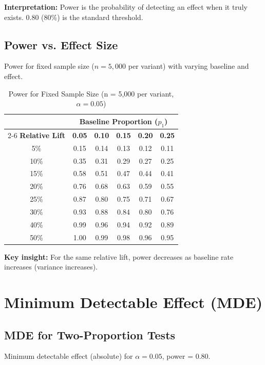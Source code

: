 \textbf{Interpretation:} Power is the probability of detecting an effect when it truly exists. 0.80 (80\%) is the standard threshold.

\subsection{Power vs. Effect Size}

Power for fixed sample size ($n = 5,000$ per variant) with varying baseline and effect.

\begin{table}[h]
\centering
\caption{Power for Fixed Sample Size (n = 5,000 per variant, $\alpha = 0.05$)}
\begin{tabular}{c|ccccc}
\toprule
& \multicolumn{5}{c}{\textbf{Baseline Proportion ($p_1$)}} \\
\cmidrule{2-6}
\textbf{Relative Lift} & \textbf{0.05} & \textbf{0.10} & \textbf{0.15} & \textbf{0.20} & \textbf{0.25} \\
\midrule
5\% & 0.15 & 0.14 & 0.13 & 0.12 & 0.11 \\
10\% & 0.35 & 0.31 & 0.29 & 0.27 & 0.25 \\
15\% & 0.58 & 0.51 & 0.47 & 0.44 & 0.41 \\
20\% & 0.76 & 0.68 & 0.63 & 0.59 & 0.55 \\
25\% & 0.87 & 0.80 & 0.75 & 0.71 & 0.67 \\
30\% & 0.93 & 0.88 & 0.84 & 0.80 & 0.76 \\
40\% & 0.99 & 0.96 & 0.94 & 0.92 & 0.89 \\
50\% & 1.00 & 0.99 & 0.98 & 0.96 & 0.95 \\
\bottomrule
\end{tabular}
\end{table}

\textbf{Key insight:} For the same relative lift, power decreases as baseline rate increases (variance increases).

\newpage

\section{Minimum Detectable Effect (MDE)}

\subsection{MDE for Two-Proportion Tests}

Minimum detectable effect (absolute) for $\alpha = 0.05$, power = 0.80.

